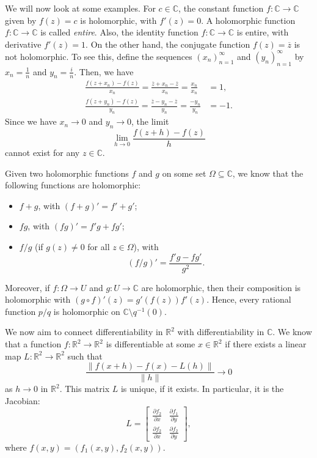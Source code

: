 \documentclass[a4paper, openany]{memoir}
\theoremstyle{definition}
\theoremstyle{plain}
\begin{document}
    We will now look at some examples. For $c \in \mathbb{C}$, the constant function $f \colon \mathbb{C} \to \mathbb{C}$ given by $f(z) = c$ is holomorphic, with $f'(z) = 0$. A holomorphic function $f \colon \mathbb{C} \to \mathbb{C}$ is called \emph{entire}. Also, the identity function $f \colon \mathbb{C} \to \mathbb{C}$ is entire, with derivative $f'(z) = 1$. On the other hand, the conjugate function $f(z) = \overline{z}$ is not holomorphic. To see this, define the sequences $(x_n)_{n=1}^\infty$ and $(y_n)_{n=1}^\infty$ by $x_n = \frac{1}{n}$ and $y_n = \frac{i}{n}$. Then, we have
    \begin{align*}
        \frac{f(z + x_n) - f(z)}{x_n} = \frac{\overline{z} + x_n - \overline{z}}{x_n} = \frac{x_n}{x_n} &= 1, \\
        \frac{f(z + y_n) - f(z)}{y_n} = \frac{\overline{z} - y_n - \overline{z}}{y_n} = \frac{-y_n}{y_n} &= -1.
    \end{align*}
    Since we have $x_n \to 0$ and $y_n \to 0$, the limit
    \[\lim_{h \to 0} \frac{f(z + h) - f(z)}{h}\]
    cannot exist for any $z \in \mathbb{C}$.
    
    Given two holomorphic functions $f$ and $g$ on some set $\Omega \subseteq \mathbb{C}$, we know that the following functions are holomorphic:
    \begin{itemize}
        \item $f + g$, with $(f + g)' = f' + g'$;
        \item $fg$, with $(fg)' = f'g + fg'$;
        \item $f/g$ (if $g(z) \neq 0$ for all $z \in \Omega$), with 
        \[(f/g)' = \frac{f'g - fg'}{g^2}.\]
    \end{itemize}
    Moreover, if $f \colon \Omega \to U$ and $g \colon U \to \mathbb{C}$ are holomorphic, then their composition is holomorphic with $(g \circ f)'(z) = g'(f(z)) f'(z)$. Hence, every rational function $p/q$ is holomorphic on $\mathbb{C} \setminus q^{-1}(0)$.

    We now aim to connect differentiability in $\mathbb{R}^2$ with differentiability in $\mathbb{C}$. We know that a function $f \colon \mathbb{R}^2 \to \mathbb{R}^2$ is differentiable at some $x \in \mathbb{R}^2$ if there exists a linear map $L \colon \mathbb{R}^2 \to \mathbb{R}^2$ such that
    \[\frac{\lVert f(x + h) - f(x) - L(h) \rVert}{\lVert h \rVert} \to 0\]
    as $h \to 0$ in $\mathbb{R}^2$. This matrix $L$ is unique, if it exists. In particular, it is the Jacobian:
    \[L = \begin{bmatrix}
        \frac{\partial f_2}{\partial x} & \frac{\partial f_1}{\partial y} \\
        \frac{\partial f_2}{\partial x} & \frac{\partial f_2}{\partial y}
    \end{bmatrix},\]
    where $f(x, y) = (f_1(x, y), f_2(x, y))$. 
    
\end{document}
